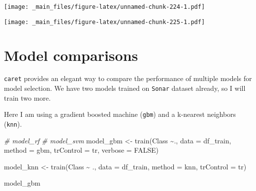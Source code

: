 \documentclass[
]{book}
\newenvironment{Shaded}{\begin{snugshade}}{\end{snugshade}}
\newcommand{\AttributeTok}[1]{\textcolor[rgb]{0.77,0.63,0.00}{#1}}
\newcommand{\CommentTok}[1]{\textcolor[rgb]{0.56,0.35,0.01}{\textit{#1}}}
\newcommand{\ConstantTok}[1]{\textcolor[rgb]{0.00,0.00,0.00}{#1}}
\newcommand{\FunctionTok}[1]{\textcolor[rgb]{0.00,0.00,0.00}{#1}}
\newcommand{\NormalTok}[1]{#1}
\newcommand{\OtherTok}[1]{\textcolor[rgb]{0.56,0.35,0.01}{#1}}
\newcommand{\SpecialCharTok}[1]{\textcolor[rgb]{0.00,0.00,0.00}{#1}}
\newcommand{\StringTok}[1]{\textcolor[rgb]{0.31,0.60,0.02}{#1}}
\begin{document}
\texttt{[image: \_main\_files/figure-latex/unnamed-chunk-224-1.pdf]}

\begin{Shaded}
\end{Shaded}

\texttt{[image: \_main\_files/figure-latex/unnamed-chunk-225-1.pdf]}

\hypertarget{model-comparisons}{%
\section{Model comparisons}\label{model-comparisons}}

\texttt{caret} provides an elegant way to compare the performance of multiple models for model selection. We have two models trained on \texttt{Sonar} dataset already, so I will train two more.

Here I am using a gradient boosted machine (\texttt{gbm}) and a k-nearest neighbors (\texttt{knn}).

\begin{Shaded}
\begin{Highlighting}[]
\CommentTok{\# model\_rf}
\CommentTok{\# model\_svm}
\NormalTok{model\_gbm }\OtherTok{\textless{}{-}} \FunctionTok{train}\NormalTok{(Class }\SpecialCharTok{\textasciitilde{}}\NormalTok{., }\AttributeTok{data =}\NormalTok{ df\_train, }
                   \AttributeTok{method =} \StringTok{\textquotesingle{}gbm\textquotesingle{}}\NormalTok{, }\AttributeTok{trControl =}\NormalTok{ tr, }
                   \AttributeTok{verbose =} \ConstantTok{FALSE}\NormalTok{)}

\NormalTok{model\_knn }\OtherTok{\textless{}{-}} \FunctionTok{train}\NormalTok{(Class }\SpecialCharTok{\textasciitilde{}}\NormalTok{ ., }\AttributeTok{data =}\NormalTok{ df\_train,}
                   \AttributeTok{method =} \StringTok{\textquotesingle{}knn\textquotesingle{}}\NormalTok{, }\AttributeTok{trControl =}\NormalTok{ tr)}
\end{Highlighting}
\end{Shaded}

\begin{Shaded}
\begin{Highlighting}[]
\NormalTok{model\_gbm}
\end{Highlighting}
\end{Shaded}
\end{document}
